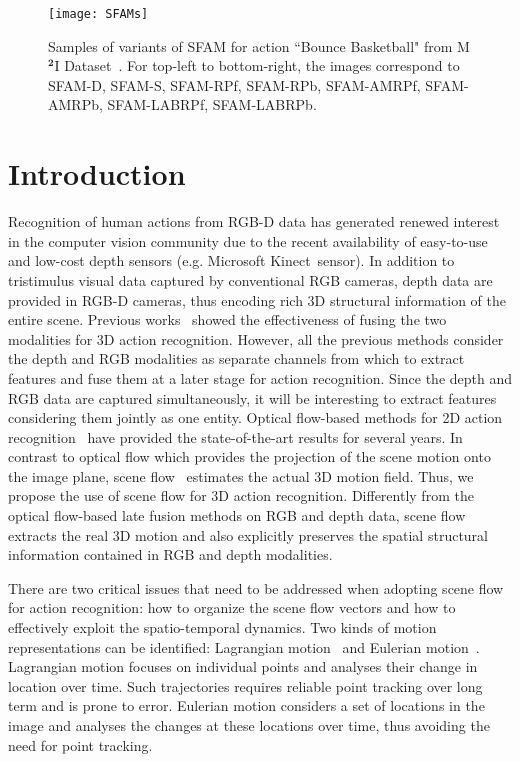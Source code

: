 \documentclass[10pt,twocolumn,letterpaper]{article}
\begin{document}
\begin{figure}[t]
\begin{center}
{\texttt{[image: SFAMs]}}
\end{center}
\caption{Samples of variants of SFAM for action ``Bounce Basketball" from M$^{\textbf{2}}$I Dataset~\cite{liu2016benchmarking}. For top-left to bottom-right, the images correspond to SFAM-D, SFAM-S, SFAM-RPf, SFAM-RPb, SFAM-AMRPf, SFAM-AMRPb, SFAM-LABRPf, SFAM-LABRPb. }
\label{SFAMs}
\end{figure}

\section{Introduction}
Recognition of human actions from RGB-D data has generated
renewed interest in the computer vision community due to the 
recent availability of easy-to-use and low-cost depth sensors (e.g. 
Microsoft Kinect~\texttrademark sensor). In addition to tristimulus visual data 
captured by conventional RGB cameras, depth data are provided in RGB-D cameras, 
thus encoding rich 3D structural information of the entire scene. 
Previous works~\cite{Nie2015,Kong2015CVPR,
hu2015jointly,wu2015watch,yu2016structure,jia2016low} showed the effectiveness 
of fusing the two modalities for 3D action recognition. However, all the 
previous methods consider the depth and RGB modalities as separate channels 
from which to extract features and fuse them at a later stage for action 
recognition. Since the depth and RGB data are captured simultaneously, it will 
be interesting to extract features considering them jointly as one entity. 
Optical flow-based methods for 2D action 
recognition~\cite{wang2013action,lan2015beyond,peng2014action,peng2016bag, 
wang2015action} have provided the state-of-the-art results for several years. 
In contrast to optical flow which provides the projection of the scene motion 
onto the image plane,
scene flow~\cite{vedula2005three,hadfield2014scene,menze2015object,hornacek2014sphereflow,jaimezprimal,sun2015layered,quiroga2014dense}
estimates the actual 3D motion field. 
Thus, we propose the use of scene flow for 3D action recognition.  
Differently from the optical flow-based late fusion methods on RGB and depth 
data, scene flow extracts the real 3D motion and also explicitly preserves 
the spatial structural information contained in RGB and depth modalities. 


There are two critical issues that need to be addressed when adopting 
scene flow for action recognition: how to organize the scene flow vectors and 
how to effectively exploit the spatio-temporal dynamics. 
Two kinds of motion representations can be identified: 
Lagrangian 
motion~\cite{wang2013action,lan2015beyond,peng2014action,
wang2015action,peng2016bag,pichao2016} and Eulerian 
motion~\cite{bobick2001recognition,
man2006individual,Yang2012a,pichao2015,pichaoTHMS,bilen2016dynamic}. Lagrangian 
motion focuses on individual points and analyses their change in location over 
time. Such trajectories requires reliable point tracking over long 
term and is prone to error. Eulerian motion considers a set of 
locations in the image and analyses the changes at these locations over time, 
thus avoiding the need for point tracking.
\end{document}
